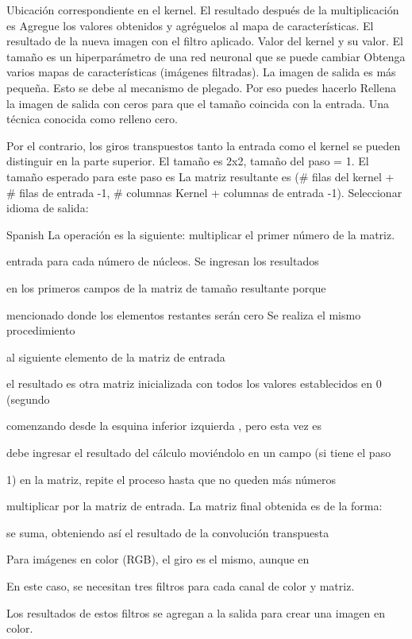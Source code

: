 Ubicación correspondiente  en el kernel. El resultado después de la multiplicación es 
 Agregue los valores obtenidos y agréguelos al mapa de características. 
 El resultado de la  nueva imagen con el filtro aplicado. Valor del kernel y su valor. 
 El tamaño es un hiperparámetro de una red neuronal que se puede cambiar  
Obtenga varios mapas de características (imágenes filtradas). 
La imagen de salida es más pequeña. 
 Esto se debe al mecanismo de plegado. Por eso puedes hacerlo 
 Rellena la imagen de salida con ceros para que el tamaño coincida con la entrada. 
Una técnica conocida como relleno cero.

Por el contrario, los giros transpuestos  tanto la entrada como el kernel se pueden distinguir en la parte superior. 
El tamaño es 2x2, tamaño del paso = 1. El tamaño esperado para este paso es 
La matriz resultante es (# filas del kernel + # filas de  entrada -1, # columnas 
Kernel +  columnas de  entrada -1).
Seleccionar idioma de salida:

Spanish
La operación es la siguiente: multiplicar el primer número de la matriz.

entrada para cada número de núcleos.
Se ingresan los resultados

en los primeros campos de la matriz de tamaño resultante porque

mencionado donde los elementos restantes serán cero
Se realiza el mismo procedimiento

al siguiente elemento de la matriz de entrada 

el resultado es otra matriz inicializada con todos los valores establecidos en 0 (segundo

comenzando desde la esquina inferior izquierda , pero esta vez es

debe ingresar el resultado del cálculo moviéndolo en un campo (si tiene el paso

1) en la matriz, repite el proceso hasta que no queden más números

multiplicar por la matriz de entrada.
La matriz final obtenida es de la forma:

se suma, obteniendo así el resultado de la convolución transpuesta 


Para imágenes en color (RGB), el giro es el mismo, aunque en

En este caso, se necesitan tres filtros para cada canal de color y matriz.

Los resultados de estos filtros se agregan a la salida para crear una imagen en color.


